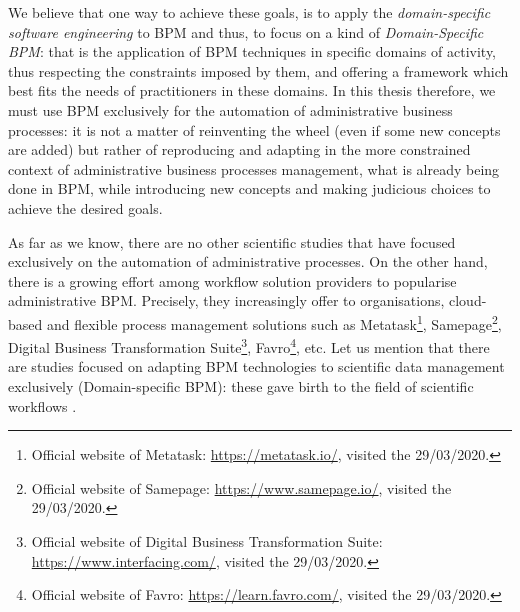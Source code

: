 We believe that one way to achieve these goals, is to apply the \textit{domain-specific software engineering} \cite{bryant2010domain} to BPM and thus, to focus on a kind of \textit{Domain-Specific BPM}: that is the application of BPM techniques in specific domains of activity, thus respecting the constraints imposed by them, and offering a framework which best fits the needs of practitioners in these domains. In this thesis therefore, we must use BPM exclusively for the automation of administrative business processes: it is not a matter of reinventing the wheel (even if some new concepts are added) but rather of reproducing and adapting in the more constrained context of administrative business processes management, what is already being done in BPM, while introducing new concepts and making judicious choices to achieve the desired goals.

As far as we know, there are no other scientific studies that have focused exclusively on the automation of administrative processes. On the other hand, there is a growing effort among workflow solution providers to popularise administrative BPM. Precisely, they increasingly offer to organisations, cloud-based and flexible process management solutions such as Metatask\footnote{Official website of Metatask: \url{https://metatask.io/}, visited the 29/03/2020.}, Samepage\footnote{Official website of Samepage: \url{https://www.samepage.io/}, visited the 29/03/2020.}, Digital Business Transformation Suite\footnote{Official website of Digital Business Transformation Suite: \url{https://www.interfacing.com/}, visited the 29/03/2020.}, Favro\footnote{Official website of Favro: \url{https://learn.favro.com/}, visited the 29/03/2020.}, etc. Let us mention that there are studies focused on adapting BPM technologies to scientific data management exclusively (Domain-specific BPM): these gave birth to the field of scientific workflows \cite{bell2009beyond, juveGideon, ludascher2006scientific}.



